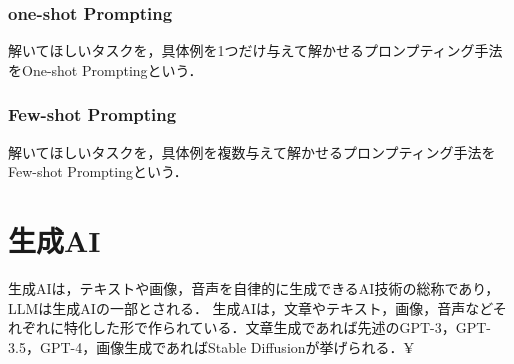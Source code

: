 \subsubsection{one-shot Prompting}
解いてほしいタスクを，具体例を1つだけ与えて解かせるプロンプティング手法をOne-shot Promptingという．

\subsubsection{Few-shot Prompting}
解いてほしいタスクを，具体例を複数与えて解かせるプロンプティング手法をFew-shot Promptingという．

\section{生成AI \label{c4s7}}
生成AIは，テキストや画像，音声を自律的に生成できるAI技術の総称であり，LLMは生成AIの一部とされる．
生成AIは，文章やテキスト，画像，音声などそれぞれに特化した形で作られている．文章生成であれば先述のGPT-3，GPT-3.5，GPT-4，画像生成であればStable Diffusionが挙げられる．¥


